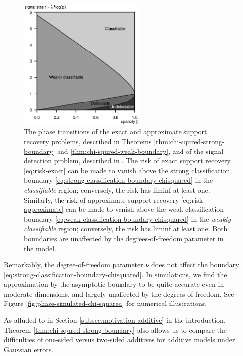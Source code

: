 \begin{figure}
      \centering
      \includegraphics[width=0.55\textwidth]{./phase_diagram_chisquared.eps}
      \caption{The phase transitions of the exact and approximate support recovery problems, described in Theorems \ref{thm:chi-squred-strong-boundary} and \ref{thm:chi-squred-weak-boundary}, and of the signal detection problem, described in \citep{donoho2004higher}. 
      The risk of exact support recovery \eqref{eq:risk-exact} can be made to vanish above the strong classification boundary \eqref{eq:strong-classification-boundary-chisquared} in the \emph{classifiable} region; conversely, the risk has liminf at least one.
      Similarly, the risk of approximate support recovery \eqref{eq:risk-approximate} can be made to vanish above the weak classification boundary \eqref{eq:weak-classification-boundary-chisquared} in the \emph{weakly classifiable} region; conversely, the risk has liminf at least one.
      Both boundaries are unaffected by the degrees-of-freedom parameter in the model.} 
      \label{fig:phase-chi-squared}
\end{figure}

\begin{remark}
Remarkably, the degree-of-freedom parameter $\nu$ does not affect the boundary \eqref{eq:strong-classification-boundary-chisquared}.
In simulations, we find the approximation by the asymptotic boundary to be quite accurate even in moderate dimensions, and largely unaffected by the degrees of freedom.
See Figure \ref{fig:phase-simulated-chi-squared} for numerical illustrations.
\end{remark}

As alluded to in Section \ref{subsec:motivation-additive} in the introduction, Theorem \ref{thm:chi-squred-strong-boundary} also allows us to compare the difficulties of one-sided versus two-sided additives for additive models under Gaussian errors.

